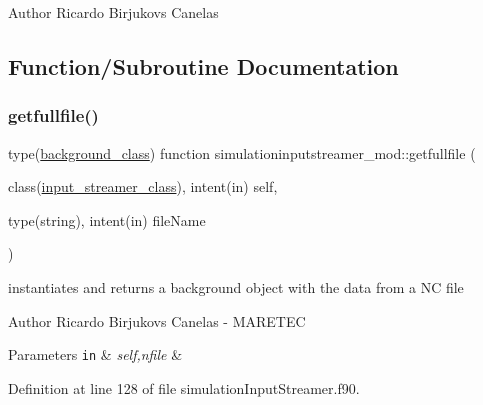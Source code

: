 \begin{DoxyAuthor}{Author}
Ricardo Birjukovs Canelas 
\end{DoxyAuthor}


\subsection{Function/\+Subroutine Documentation}
\mbox{\label{namespacesimulationinputstreamer__mod_a532b4022fdb6db20d41ca8082d4e7423}} 
\subsubsection{\texorpdfstring{getfullfile()}{getfullfile()}}
{\footnotesize\ttfamily type(\mbox{\hyperlink{structbackground__mod_1_1background__class}{background\+\_\+class}}) function simulationinputstreamer\+\_\+mod\+::getfullfile (\begin{DoxyParamCaption}\item[{class(\mbox{\hyperlink{structsimulationinputstreamer__mod_1_1input__streamer__class}{input\+\_\+streamer\+\_\+class}}), intent(in)}]{self,  }\item[{type(string), intent(in)}]{file\+Name }\end{DoxyParamCaption})\hspace{0.3cm}{\ttfamily [private]}}



instantiates and returns a background object with the data from a NC file 

\begin{DoxyAuthor}{Author}
Ricardo Birjukovs Canelas -\/ M\+A\+R\+E\+T\+EC 
\end{DoxyAuthor}

\begin{DoxyParams}[1]{Parameters}
\mbox{\tt in}  & {\em self,nfile} & \\
\hline
\end{DoxyParams}


Definition at line 128 of file simulation\+Input\+Streamer.\+f90.


